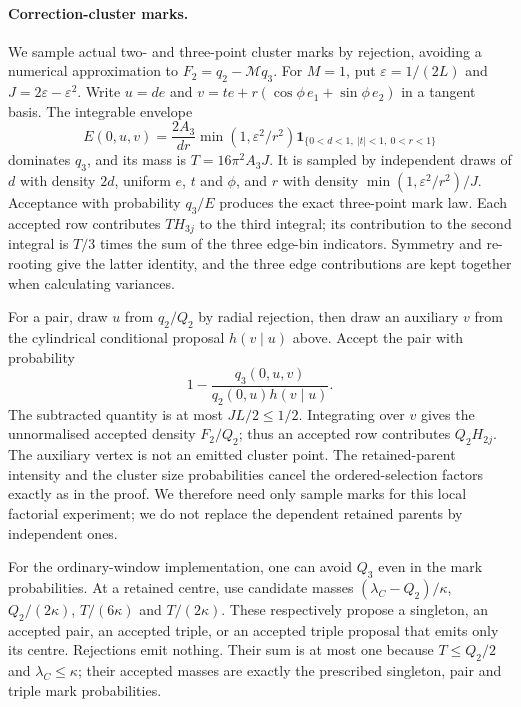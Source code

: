 \documentclass[11pt,a4paper]{article}
\numberwithin{equation}{section}
\theoremstyle{definition}
\theoremstyle{remark}
\begin{document}
\paragraph{Correction-cluster marks.}
We sample actual two- and three-point cluster marks by rejection, avoiding
a numerical approximation to $F_2=q_2-\mathcal Mq_3$. For $M=1$, put
$\varepsilon=1/(2L)$ and $J=2\varepsilon-\varepsilon^2$. Write
$u=de$ and $v=te+r(\cos\phi\,e_1+\sin\phi\,e_2)$ in a tangent basis.
The integrable envelope
\[
 E(0,u,v)=\frac{2A_3}{dr}\min(1,\varepsilon^2/r^2)
      \mathbf1_{\{0<d<1,\ |t|<1,\ 0<r<1\}}
\]
dominates $q_3$, and its mass is $T=16\pi^2A_3J$.
It is sampled by independent draws of $d$ with density $2d$, uniform $e$,
$t$ and $\phi$, and $r$ with density
$\min(1,\varepsilon^2/r^2)/J$. Acceptance with probability $q_3/E$
produces the exact three-point mark law. Each accepted row contributes
$TH_{3j}$ to the third integral; its contribution to the second integral
is $T/3$ times the sum of the three edge-bin indicators. Symmetry and
re-rooting give the latter identity, and the three edge contributions are
kept together when calculating variances.

For a pair, draw $u$ from $q_2/Q_2$ by radial rejection, then draw an auxiliary
$v$ from the cylindrical conditional proposal $h(v\mid u)$ above. Accept
the pair with probability
\[
 1-\frac{q_3(0,u,v)}{q_2(0,u)h(v\mid u)}.
\]
The subtracted quantity is at most $JL/2\leq1/2$. Integrating over $v$ gives
the unnormalised accepted density $F_2/Q_2$; thus an accepted row contributes
$Q_2H_{2j}$. The auxiliary vertex is not an emitted cluster point.
The retained-parent intensity and the cluster size probabilities cancel
the ordered-selection factors exactly as in the proof. We therefore need
only sample marks for this local factorial experiment; we do not replace
the dependent retained parents by independent ones.

For the ordinary-window implementation, one can avoid $Q_3$ even in the
mark probabilities. At a retained centre, use candidate masses
$(\lambda_C-Q_2)/\kappa$, $Q_2/(2\kappa)$, $T/(6\kappa)$ and
$T/(2\kappa)$. These respectively propose a singleton, an accepted pair,
an accepted triple, or an accepted triple proposal that emits only its
centre. Rejections emit nothing. Their sum is at most one because
$T\leq Q_2/2$ and $\lambda_C\leq\kappa$; their accepted masses are exactly
the prescribed singleton, pair and triple mark probabilities.
\end{document}
